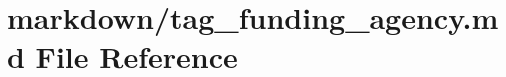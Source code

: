 \hypertarget{tag__funding__agency_8md}{}\section{markdown/tag\+\_\+funding\+\_\+agency.md File Reference}
\label{tag__funding__agency_8md}
